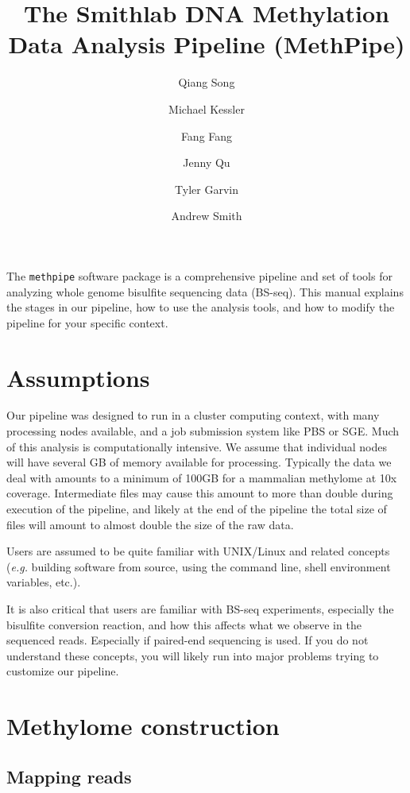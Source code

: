 \documentclass[10pt]{article}
\title{The Smithlab DNA Methylation Data Analysis Pipeline (MethPipe)}
\author{Qiang Song \and Michael Kessler \and Fang Fang \and
  Jenny Qu \and Tyler Garvin \and Andrew Smith}
\newcommand{\meth}{\texttt{methpipe}}
\begin{document}
\maketitle

The \meth{} software package is a comprehensive pipeline and set of
tools for analyzing whole genome bisulfite sequencing data
(BS-seq). This manual explains the stages in our pipeline, how to use
the analysis tools, and how to modify the pipeline for your specific
context.

\section{Assumptions}

Our pipeline was designed to run in a cluster computing context, with
many processing nodes available, and a job submission system like PBS
or SGE. Much of this analysis is computationally intensive. We assume
that individual nodes will have several GB of memory available for
processing. Typically the data we deal with amounts to a minimum of
100GB for a mammalian methylome at 10x coverage. Intermediate files
may cause this amount to more than double during execution of the
pipeline, and likely at the end of the pipeline the total size of
files will amount to almost double the size of the raw data.

Users are assumed to be quite familiar with UNIX/Linux and related
concepts ({\em e.g.} building software from source, using the command
line, shell environment variables, etc.).

It is also critical that users are familiar with BS-seq experiments,
especially the bisulfite conversion reaction, and how this affects
what we observe in the sequenced reads. Especially if paired-end
sequencing is used. If you do not understand these concepts, you will
likely run into major problems trying to customize our pipeline.

\section{Methylome construction}

\subsection{Mapping reads}
\label{sec:mapping}

\end{document}

